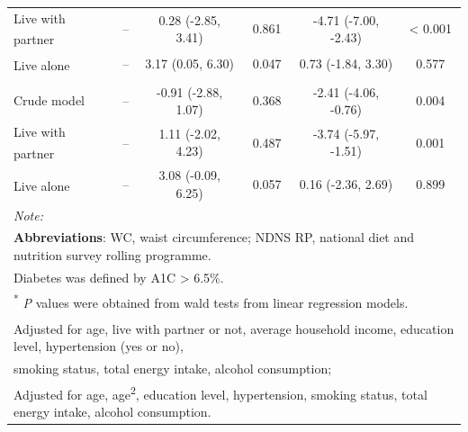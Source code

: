 \begin{table}[H]
\begin{tabular}[t]{lccccc}
		\hspace{1em}\hspace{1em}Live with partner\textsuperscript{\ddag} & -- & 0.28 (-2.85, 3.41) & 0.861 & -4.71 (-7.00, -2.43) & < 0.001\\
		\hspace{1em}\hspace{1em}Live alone\textsuperscript{\ddag} & -- & 3.17 (0.05, 6.30) & 0.047 & 0.73 (-1.84, 3.30) & 0.577\\
		\addlinespace[0.3em]
		\multicolumn{6}{l}{\hspace{1em}\textbf{WC in non-diabetics}}\\
		\hspace{1em}\hspace{1em}Crude model & -- & -0.91 (-2.88, 1.07) & 0.368 & -2.41 (-4.06, -0.76) & 0.004\\
		\hspace{1em}\hspace{1em}Live with partner\textsuperscript{\ddag} & -- & 1.11 (-2.02, 4.23) & 0.487 & -3.74 (-5.97, -1.51) & 0.001\\
		\hspace{1em}\hspace{1em}Live alone\textsuperscript{\ddag} & -- & 3.08 (-0.09, 6.25) & 0.057 & 0.16 (-2.36, 2.69) & 0.899\\
		\bottomrule
		\multicolumn{6}{l}{{\scriptsize \textit{Note: }}}\\
		\multicolumn{6}{l}{{\scriptsize \textbf{Abbreviations}: WC, waist circumference; NDNS RP, national diet and nutrition survey rolling programme.}}\\
		\multicolumn{6}{l}{{\scriptsize Diabetes was defined by A1C > 6.5\%. }}\\
		\multicolumn{6}{l}{{\scriptsize \textsuperscript{*} \textit{P} values were obtained from wald tests from linear regression models.}}\\
		\multicolumn{6}{l}{{\scriptsize \textsuperscript{\dag} Adjusted for age, live with partner or not, average household income, education level, hypertension (yes or no),}}\\
		\multicolumn{6}{l}{{\scriptsize smoking status, total energy intake, alcohol consumption;}}\\
		\multicolumn{6}{l}{{\scriptsize \textsuperscript{\ddag} Adjusted for age, age\textsuperscript{2}, education level, hypertension, smoking status, total energy intake, alcohol consumption.}}\\
	\end{tabular}
\end{table}
\vspace{-0.3cm}


